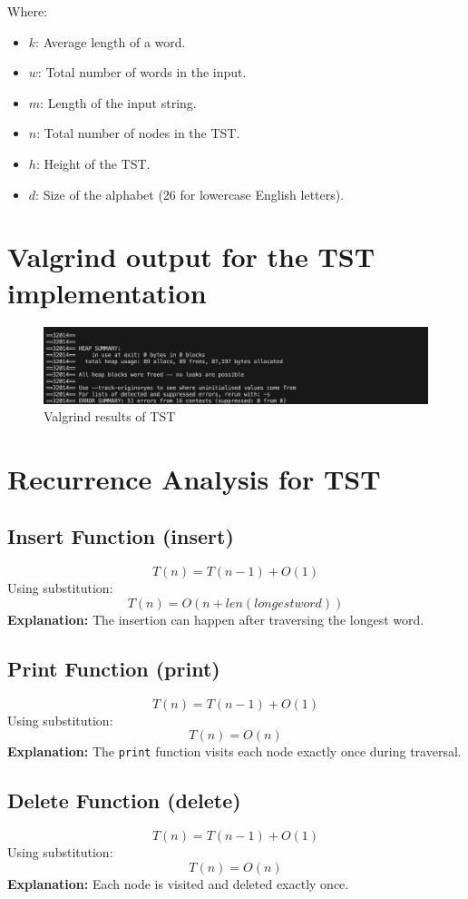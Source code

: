 \documentclass{rapport}
\begin{document}
Where:
\begin{itemize}
    \item \(k\): Average length of a word.
    \item \(w\): Total number of words in the input.
    \item \(m\): Length of the input string.
    \item \(n\): Total number of nodes in the TST.
    \item \(h\): Height of the TST.
    \item \(d\): Size of the alphabet (26 for lowercase English letters).
\end{itemize}
\section{Valgrind output for the TST implementation}
\begin{figure}[H]
    \centering
    \includegraphics[width=1\textwidth]{v2.png}
    \caption{Valgrind results of TST}
    \label{fig:TST_valgrind}
\end{figure}

\section{Recurrence Analysis for TST}

\subsection{Insert Function (insert)}
\[
T(n) = T(n - 1) + O(1)
\]
Using substitution:
\[
T(n) = O(n + len(longest word))
\]
\textbf{Explanation:} The insertion can happen after traversing the longest word.

\subsection{Print Function (print)}
\[
T(n) = T(n - 1) + O(1)
\]
Using substitution:
\[
T(n) = O(n )
\]
\textbf{Explanation:} The \texttt{print} function visits each node exactly once during traversal.


\subsection{Delete Function (delete)}
\[
T(n) = T(n - 1) + O(1)
\]
Using substitution:
\[
T(n) = O(n)
\]
\textbf{Explanation:} Each node is visited and deleted exactly once.
\end{document}
